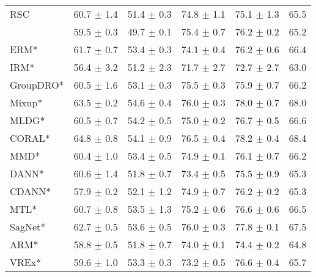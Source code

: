 \begin{table*}
\begin{center}
\begin{tabular}{lccccc}
RSC                  & 60.7 $\pm$ 1.4       & 51.4 $\pm$ 0.3       & 74.8 $\pm$ 1.1       & 75.1 $\pm$ 1.3       & 65.5                \\
\divcams 	         & 59.5 $\pm$ 0.3       & 49.7 $\pm$ 0.1        & 75.4 $\pm$ 0.7       & 76.2 $\pm$ 0.2        & 65.2                 \\
\midrule
ERM*                  & 61.7 $\pm$ 0.7       & 53.4 $\pm$ 0.3       & 74.1 $\pm$ 0.4       & 76.2 $\pm$ 0.6       & 66.4                 \\
IRM*                  & 56.4 $\pm$ 3.2       & 51.2 $\pm$ 2.3       & 71.7 $\pm$ 2.7       & 72.7 $\pm$ 2.7       & 63.0                 \\
GroupDRO*             & 60.5 $\pm$ 1.6       & 53.1 $\pm$ 0.3       & 75.5 $\pm$ 0.3       & 75.9 $\pm$ 0.7       & 66.2                 \\
Mixup*                & 63.5 $\pm$ 0.2       & 54.6 $\pm$ 0.4       & 76.0 $\pm$ 0.3       & 78.0 $\pm$ 0.7       & 68.0                 \\
MLDG*                 & 60.5 $\pm$ 0.7       & 54.2 $\pm$ 0.5       & 75.0 $\pm$ 0.2       & 76.7 $\pm$ 0.5       & 66.6                 \\
CORAL*                & 64.8 $\pm$ 0.8       & 54.1 $\pm$ 0.9       & 76.5 $\pm$ 0.4       & 78.2 $\pm$ 0.4       & 68.4                 \\
MMD*                  & 60.4 $\pm$ 1.0       & 53.4 $\pm$ 0.5       & 74.9 $\pm$ 0.1       & 76.1 $\pm$ 0.7       & 66.2                 \\
DANN*                 & 60.6 $\pm$ 1.4       & 51.8 $\pm$ 0.7       & 73.4 $\pm$ 0.5       & 75.5 $\pm$ 0.9       & 65.3                 \\
CDANN*                & 57.9 $\pm$ 0.2       & 52.1 $\pm$ 1.2       & 74.9 $\pm$ 0.7       & 76.2 $\pm$ 0.2       & 65.3                 \\
MTL*                  & 60.7 $\pm$ 0.8       & 53.5 $\pm$ 1.3       & 75.2 $\pm$ 0.6       & 76.6 $\pm$ 0.6       & 66.5                 \\
SagNet*               & 62.7 $\pm$ 0.5       & 53.6 $\pm$ 0.5       & 76.0 $\pm$ 0.3       & 77.8 $\pm$ 0.1       & 67.5                 \\
ARM*                  & 58.8 $\pm$ 0.5       & 51.8 $\pm$ 0.7       & 74.0 $\pm$ 0.1       & 74.4 $\pm$ 0.2       & 64.8                 \\
VREx*                 & 59.6 $\pm$ 1.0       & 53.3 $\pm$ 0.3       & 73.2 $\pm$ 0.5       & 76.6 $\pm$ 0.4       & 65.7                 \\

\end{tabular}
\end{center}
\end{table*}
